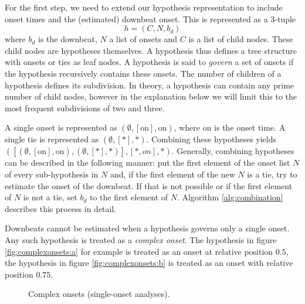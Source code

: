 For the first step, we need to extend our hypothesis representation to include onset times and the (estimated) downbeat onset. This is represented as a 3-tuple
\begin{equation}
h = (C, N, b_d)
\end{equation}
where $b_d$ is the downbeat, $N$ a list of onsets and $C$ is a list of child nodes. These child nodes are hypotheses themselves. A hypothesis thus defines a tree structure with onsets or ties as leaf nodes. A hypothesis is said to \textit{govern} a set of onsets if the hypothesis recursively contains these onsets. The number of children of a hypothesis defines its subdivision. In theory, a hypothesis can contain any prime number of child nodes, however in the explanation below we will limit this to the most frequent subdivisions of two and three.

A single onset is represented as $(\emptyset, [\textrm{on}], \textrm{on})$, where on is the onset time. A single tie is represented as $(\emptyset, [*], *)$.  Combining these hypotheses yields $([(\emptyset, [\textrm{on}], \textrm{on}), (\emptyset, [*], *)], [*, on], *)$. Generally, combining hypotheses can be described in the following manner: put the first element of the onset list $N$ of every sub-hypothesis in $N$ and, if the first element of the new $N$ is a tie, try to estimate the onset of the downbeat. If that is not possible or if the first element of $N$ is not a tie, set $b_d$ to the first element of $N$. Algorithm \ref{alg:combination} describes this process in detail.

Downbeats cannot be estimated when a hypothesis governs only a single onset. Any such hypothesis is treated as a \textit{complex onset}. The hypothesis in figure \ref{fig:complexonsets:a} for example is treated as an onset at relative position $0.5$, the hypothesis in figure \ref{fig:complexonsets:b} is treated as an onset with relative position $0.75$.

\begin{figure}
\centering
{}
\caption{Complex onsets (single-onset analyses).}
\label{fig:singlenotes}
\end{figure}

